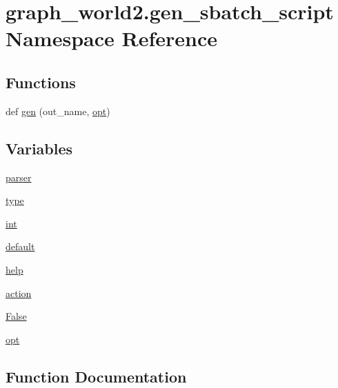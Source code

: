 \hypertarget{namespacegraph__world2_1_1gen__sbatch__script}{}\section{graph\+\_\+world2.\+gen\+\_\+sbatch\+\_\+script Namespace Reference}
\label{namespacegraph__world2_1_1gen__sbatch__script}
\subsection*{Functions}
\begin{DoxyCompactItemize}
\item 
def \hyperlink{namespacegraph__world2_1_1gen__sbatch__script_a39f73c9b077f4bb92853e7033e35c1b1}{gen} (out\+\_\+name, \hyperlink{namespacegraph__world2_1_1gen__sbatch__script_a8bebb42a9387f9a04c4414fca68bb6c2}{opt})
\end{DoxyCompactItemize}
\subsection*{Variables}
\begin{DoxyCompactItemize}
\item 
\hyperlink{namespacegraph__world2_1_1gen__sbatch__script_a35d72fb0a48043fbb762ae06dee52ed8}{parser}
\item 
\hyperlink{namespacegraph__world2_1_1gen__sbatch__script_af55e4850ba1b0390ce5d5c1c88fbc43c}{type}
\item 
\hyperlink{namespacegraph__world2_1_1gen__sbatch__script_a9a98e06b860a43c4f37a22688720af47}{int}
\item 
\hyperlink{namespacegraph__world2_1_1gen__sbatch__script_a3763c39f7acd6a0329c59ed4ca14a63a}{default}
\item 
\hyperlink{namespacegraph__world2_1_1gen__sbatch__script_afaa4d6a02b2c7127d16d0830a0b16fa3}{help}
\item 
\hyperlink{namespacegraph__world2_1_1gen__sbatch__script_ae1cfc2209c3d556ec6724bd1c913b71a}{action}
\item 
\hyperlink{namespacegraph__world2_1_1gen__sbatch__script_ac5ddd33f5082846123a11eea2524ba43}{False}
\item 
\hyperlink{namespacegraph__world2_1_1gen__sbatch__script_a8bebb42a9387f9a04c4414fca68bb6c2}{opt}
\end{DoxyCompactItemize}


\subsection{Function Documentation}
\mbox{\label{namespacegraph__world2_1_1gen__sbatch__script_a39f73c9b077f4bb92853e7033e35c1b1}} 
